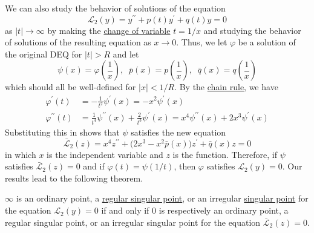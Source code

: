 \documentclass{article}
\newcounter{theorem}[section]
\begin{document}
      We can also study the behavior of solutions of the equation
      \begin{equation}
        \mathcal{L}_2 (y) = y^{\prime\prime} + p(t) y^\prime + q(t) y = 0
      \end{equation}
      as $|t| \rightarrow \infty$ by making the \hyperref[real-thm:change-of-variable]{change of variable} $t = 1/x$ and studying the behavior of solutions of the resulting equation as $x \rightarrow 0$. Thus, we let $\varphi$ be a solution of the original DEQ for $|t|>R$ and let
      \begin{equation}
        \psi(x) = \varphi(\frac{1}{x}), \;\; \bar{p}(x) = p(\frac{1}{x}), \;\; \bar{q}(x) = q(\frac{1}{x})
      \end{equation}
      which should all be well-defined for $|x|<1/R$. By the \hyperref[mv-thm:chain-rule]{chain rule}, we have
      \begin{align*}
          \varphi^\prime (t) & = -\frac{1}{t^2} \psi^\prime (x) = -x^2 \psi^\prime (x) \\
          \varphi^{\prime\prime} (t) & = \frac{1}{t^4} \psi^{\prime\prime} (x) + \frac{2}{t^3} \psi^\prime (x) = x^4 \psi^{\prime\prime}(x) + 2x^3 \psi^\prime (x) 
      \end{align*}
      Substituting this in shows that $\psi$ satisfies the new equation
      \begin{equation}
        \bar{\mathcal{L}}_2 (z) = x^4 z^{\prime\prime} + \big( 2x^3 - x^2 \bar{p}(x)\big) z^\prime + \bar{q} (x) z= 0
      \end{equation}
      in which $x$ is the independent variable and $z$ is the function. Therefore, if $\psi$ satisfies $\bar{\mathcal{L}}_2 (z) = 0$ and if $\varphi(t) = \psi(1/t)$, then $\varphi$ satisfies $\mathcal{L}_2 (y) = 0$. Our results lead to the following theorem. 

      \begin{theorem}
        \label{thm:singularities-at-infinity}
      $\infty$ is an ordinary point, a \hyperref[def:regular-singular-point]{regular singular point}, or an irregular \hyperref[def:singular-point]{singular point} for the equation $\mathcal{L}_2 (y) = 0$ if and only if $0$ is respectively an ordinary point, a regular singular point, or an irregular singular point for the equation $\bar{\mathcal{L}}_2 (z) = 0$. 
      \end{theorem}
\end{document}
